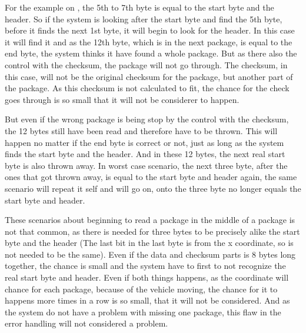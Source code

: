 For the example on , the 5th to 7th byte is equal to the start byte and the header. So if the system is looking after the start byte and find the 5th byte, before it finds the next 1st byte, it will begin to look for the header. In this case it will find it and as the 12th byte, which is in the next package, is equal to the end byte, the system thinks it have found a whole package. But as there also the control with the checksum, the package will not go through. The checksum, in this case, will not be the original checksum for the package, but another part of the package. As this checksum is not calculated to fit, the chance for the check goes through is so small that it will not be considerer to happen. 

But even if the wrong package is being stop by the control with the checksum, the 12 bytes still have been read and therefore have to be thrown. This will happen no matter if the end byte is correct or not, just as long as the system finds the start byte and the header. And in these 12 bytes, the next real start byte is also thrown away. In worst case scenario, the next three byte, after the ones that got thrown away, is equal to the start byte and header again, the same scenario will repeat it self and will go on, onto the three byte no longer equals the start byte and header.

These scenarios about beginning to read a package in the middle of a package is not that common, as there is needed for three bytes to be precisely alike the start byte and the header (The last bit in the last byte is from the x coordinate, so is not needed to be the same). Even if the data and checksum parts is 8 bytes long together, the chance is small and the system have to first to not recognize the real start byte and header. Even if both things happens, as the coordinate will chance for each package, because of the vehicle moving, the chance for it to happens more times in a row is so small, that it will not be considered. And as the system do not have a problem with missing one package, this flaw in the error handling will not considered a problem.


